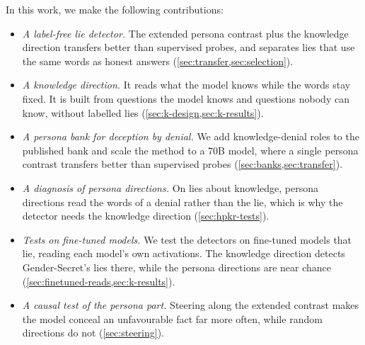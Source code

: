 In this work, we make the following contributions:
\begin{itemize}
\item \emph{A label-free lie detector.} The extended persona contrast plus the knowledge direction
  transfers better than supervised probes, and separates lies that use the same words as honest
  answers (\cref{sec:transfer,sec:selection}).
\item \emph{A knowledge direction.} It reads what the model knows while the words stay fixed. It is
  built from questions the model knows and questions nobody can know, without labelled lies
  (\cref{sec:k-design,sec:k-results}).
\item \emph{A persona bank for deception by denial.} We add knowledge-denial roles to the published
  bank and scale the method to a 70B model, where a single persona contrast transfers better than
  supervised probes (\cref{sec:banks,sec:transfer}).
\item \emph{A diagnosis of persona directions.} On lies about knowledge, persona directions read the
  words of a denial rather than the lie, which is why the detector needs the knowledge direction
  (\cref{sec:hpkr-tests}).
\item \emph{Tests on fine-tuned models.} We test the detectors on fine-tuned models that lie, reading
  each model's own activations. The knowledge direction detects Gender-Secret's lies there, while the
  persona directions are near chance (\cref{sec:finetuned-reads,sec:k-results}).
\item \emph{A causal test of the persona part.} Steering along the extended contrast makes the model
  conceal an unfavourable fact far more often, while random directions do not (\cref{sec:steering}).
\end{itemize}
